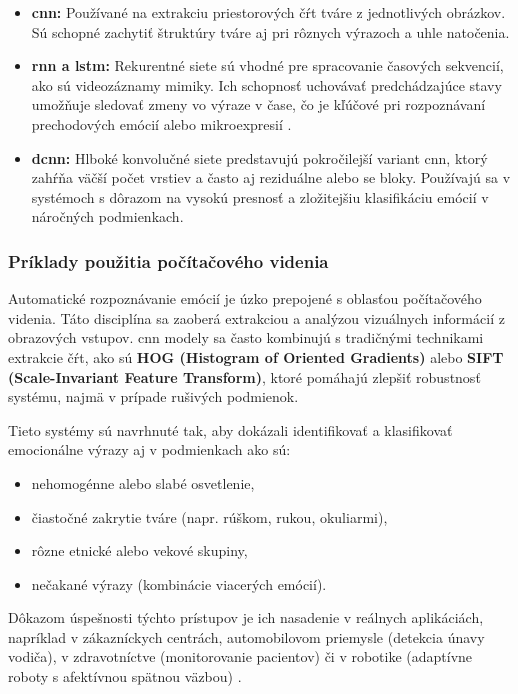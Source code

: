 \begin{itemize}
    \item \textbf{\gls{cnn}:} Používané na extrakciu priestorových čŕt tváre z jednotlivých obrázkov. Sú schopné zachytiť štruktúry tváre aj pri rôznych výrazoch a uhle natočenia.
    
    \item \textbf{\gls{rnn} a \gls{lstm}:} Rekurentné siete sú vhodné pre spracovanie časových sekvencií, ako sú videozáznamy mimiky. Ich schopnosť uchovávať predchádzajúce stavy umožňuje sledovať zmeny vo výraze v čase, čo je kľúčové pri rozpoznávaní prechodových emócií alebo mikroexpresií \cite{article02}.
    
    \item \textbf{\gls{dcnn}:} Hlboké konvolučné siete predstavujú pokročilejší variant \gls{cnn}, ktorý zahŕňa väčší počet vrstiev a často aj reziduálne alebo \gls{se} bloky. Používajú sa v systémoch s dôrazom na vysokú presnosť a zložitejšiu klasifikáciu emócií v náročných podmienkach.
\end{itemize}

\subsubsection{Príklady použitia počítačového videnia}

Automatické rozpoznávanie emócií je úzko prepojené s oblasťou počítačového videnia. Táto disciplína sa zaoberá extrakciou a analýzou vizuálnych informácií z obrazových vstupov. \gls{cnn} modely sa často kombinujú s tradičnými technikami extrakcie čŕt, ako sú \textbf{HOG (Histogram of Oriented Gradients)} alebo \textbf{SIFT (Scale-Invariant Feature Transform)}, ktoré pomáhajú zlepšiť robustnosť systému, najmä v prípade rušivých podmienok.

Tieto systémy sú navrhnuté tak, aby dokázali identifikovať a klasifikovať emocionálne výrazy aj v podmienkach ako sú:

\begin{itemize}
    \item nehomogénne alebo slabé osvetlenie,
    \item čiastočné zakrytie tváre (napr. rúškom, rukou, okuliarmi),
    \item rôzne etnické alebo vekové skupiny,
    \item nečakané výrazy (kombinácie viacerých emócií).
\end{itemize}

Dôkazom úspešnosti týchto prístupov je ich nasadenie v reálnych aplikáciách, napríklad v zákazníckych centrách, automobilovom priemysle (detekcia únavy vodiča), v zdravotníctve (monitorovanie pacientov) či v robotike (adaptívne roboty s afektívnou spätnou väzbou) \cite{inProceedings01}.



